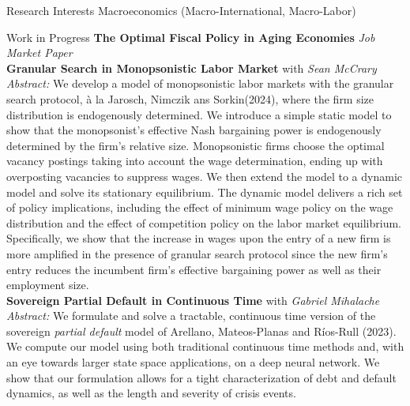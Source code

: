 \documentclass{cv} %
\begin{document}
\begin{rSection}{Research Interests}
Macroeconomics (Macro-International, Macro-Labor)
\end{rSection}
\bigskip
\begin{rSection}{Work in Progress}
\medskip
{\bf The Optimal Fiscal Policy in Aging Economies} \emph{Job Market Paper} \\


\medskip
{\bf Granular Search in Monopsonistic Labor Market} with \emph{Sean McCrary} \\
\begin{adjustbox}{minipage=0.95\textwidth, right}
	\vspace{0.3em} {\emph{Abstract:} We develop a model of monopsonistic labor markets with the granular search protocol, à la Jarosch, Nimczik ans Sorkin(2024), where the firm size distribution is endogenously determined. We introduce a simple static model to show that the monopsonist's effective Nash bargaining power is endogenously determined by the firm's relative size. Monopsonistic firms choose the optimal vacancy postings taking into account the wage determination, ending up with overposting vacancies to suppress wages. We then extend the model to a  dynamic model and solve its stationary equilibrium. The dynamic model delivers a rich set of policy implications, including the effect of minimum wage policy on the wage distribution and the effect of competition policy on the labor market equilibrium. Specifically, we show that the increase in wages upon the entry of a new firm is more amplified in the presence of granular search protocol since the new firm's entry reduces the incumbent firm's effective bargaining power as well as their employment size.}
\end{adjustbox}\\

\medskip
{\bf Sovereign Partial Default in Continuous Time} with \emph{Gabriel Mihalache} \\
	 \begin{adjustbox}{minipage=0.95\textwidth, right}
		\vspace{0.3em} {\emph{Abstract:} We formulate and solve a tractable, continuous time version of the sovereign \emph{partial default} model of Arellano, Mateos-Planas and Ríos-Rull (2023). We compute our model using both traditional continuous time methods and, with an eye towards larger state space applications, on a deep neural network. We show that our formulation allows for a tight characterization of debt and default dynamics, as well as the length and severity of crisis events.}
	\end{adjustbox}\\


\end{rSection}
\end{document}

